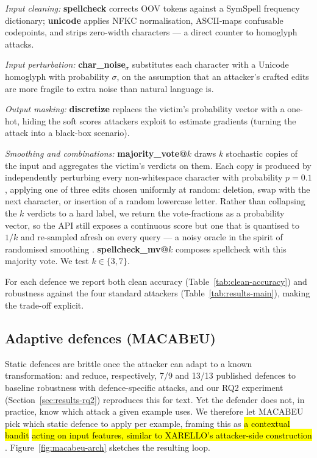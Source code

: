 \documentclass[11pt]{article}
\begin{document}
\emph{Input cleaning:} \textbf{spellcheck} corrects OOV tokens against a SymSpell frequency dictionary; \textbf{unicode} applies NFKC normalisation, ASCII-maps confusable codepoints, and strips zero-width characters --- a direct counter to homoglyph attacks.

\emph{Input perturbation:} \textbf{char\_noise}$_\sigma$ substitutes each character with a Unicode homoglyph with probability $\sigma$, on the assumption that an attacker's crafted edits are more fragile to extra noise than natural language is.

\emph{Output masking:} \textbf{discretize} replaces the victim's probability vector with a one-hot, hiding the soft scores attackers exploit to estimate gradients (turning the attack into a black-box scenario).


\emph{Smoothing and combinations:} \textbf{majority\_vote@$k$} draws $k$ stochastic copies of the input and aggregates the victim's verdicts on them. Each copy is produced by independently perturbing every non-whitespace character with probability $p{=}0.1$, applying one of three edits chosen uniformly at random: deletion, swap with the next character, or insertion of a random lowercase letter. Rather than collapsing the $k$ verdicts to a hard label, we return the vote-fractions as a probability vector, so the API still exposes a continuous score but one that is quantised to $1/k$ and re-sampled afresh on every query --- a noisy oracle in the spirit of randomised smoothing \citep{Ye2020safer}. \textbf{spellcheck\_mv@$k$} composes spellcheck with this majority vote. We test $k \in \{3, 7\}$.

For each defence we report both clean accuracy (Table~\ref{tab:clean-accuracy}) and robustness against the four standard attackers (Table~\ref{tab:results-main}), making the trade-off explicit.




\subsection{Adaptive defences (MACABEU)}
\label{sec:macabeu}
Static defences are brittle once the attacker can adapt to a known transformation: \citet{Athalye2018} and \citet{Tramer2020} reduce, respectively, 7/9 and 13/13 published defences to baseline robustness with defence-specific attacks, and our RQ2 experiment (Section~\ref{sec:results-rq2}) reproduces this for text. Yet the defender does not, in practice, know which attack a given example uses. We therefore let MACABEU pick which static defence to apply per example, framing this as \hl{a contextual bandit} \citep{LiContextualBandit2010} \hl{acting on input features, similar to XARELLO's attacker-side construction} \citep{przybyla-etal-2024-know}. Figure~\ref{fig:macabeu-arch} sketches the resulting loop.
\end{document}
